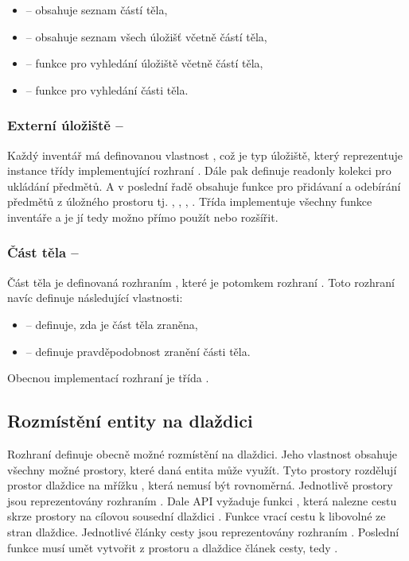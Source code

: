 \begin{itemize}
\item {} -- obsahuje seznam částí těla,
\item {} -- obsahuje seznam všech úložišť včetně částí těla,
\item {} -- funkce pro vyhledání úložiště včetně částí těla,
\item {} -- funkce pro vyhledání části těla. 
\end{itemize}

\subsubsection{Externí úložiště -- }
Každý inventář má definovanou vlastnost , což je typ úložiště, který reprezentuje instance třídy 
implementující rozhraní . Dále pak definuje readonly kolekci  pro ukládání předmětů.
A v poslední řadě obsahuje funkce pro přidávaní a odebírání předmětů z úložného prostoru tj. , , ,
. Třída  implementuje všechny funkce inventáře a je jí tedy možno přímo použít nebo rozšířit.

\subsubsection{Část těla -- }
Část těla je definovaná rozhraním , které je potomkem rozhraní . Toto rozhraní navíc definuje 
následující vlastnosti: 
\begin{itemize}
\item {} -- definuje, zda je část těla zraněna,
\item {} -- definuje pravděpodobnost zranění části těla.
\end{itemize}

Obecnou implementací rozhraní je třída . 

\subsection{Rozmístění entity na dlaždici}\label{layout-manager-section}

Rozhraní  definuje obecně možné rozmístění na dlaždici. Jeho vlastnost  obsahuje všechny možné prostory, které daná entita může využít.
Tyto prostory rozdělují prostor dlaždice na mřížku , která nemusí být rovnoměrná.
Jednotlivě prostory jsou reprezentovány rozhraním . Dale API vyžaduje funkci , která nalezne cestu skrze prostory
na cílovou sousední dlaždici . Funkce  vrací cestu k libovolné ze stran dlaždice. Jednotlivé články cesty jsou 
reprezentovány rozhraním . Poslední funkce musí umět vytvořit z prostoru a dlaždice článek cesty,
tedy .  

